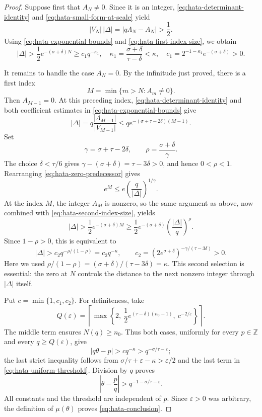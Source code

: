 \documentclass[10pt,a4paper]{amsart}
\begin{document}
\begin{proof}
Suppose first that \(A_N\ne0\).  Since it is an integer,
\eqref{eq:hata-determinant-identity} and
\eqref{eq:hata-small-form-at-scale} yield
\[
 |V_N|\,|\Delta|=|q\Lambda_N-A_N|>\frac12.
\]
Using \eqref{eq:hata-exponential-bounds} and
\eqref{eq:hata-first-index-size}, we obtain
\begin{equation}\label{eq:hata-case-one}
 |\Delta|>\frac12e^{-(\sigma+\delta)N}
 \geq c_1q^{-\kappa_1},
 \quad
 \kappa_1=\frac{\sigma+\delta}{\tau-\delta}<\kappa,
 \quad
 c_1=2^{-1-\kappa_1}e^{-(\sigma+\delta)}>0.
\end{equation}

It remains to handle the case \(A_N=0\).  By the infinitude just proved,
there is a first index
\[
 M=\min\{m>N:A_m\ne0\}.
\]
Then \(A_{M-1}=0\).  At this preceding index,
\eqref{eq:hata-determinant-identity} and both coefficient estimates in
\eqref{eq:hata-exponential-bounds} give
\begin{equation}\label{eq:hata-zero-predecessor}
 |\Delta|=q\frac{|\Lambda_{M-1}|}{|V_{M-1}|}
 \leq q e^{-(\sigma+\tau-2\delta)(M-1)}.
\end{equation}
Set
\[
 \gamma=\sigma+\tau-2\delta,
 \qquad \rho=\frac{\sigma+\delta}{\gamma}.
\]
The choice \(\delta<\tau/6\) gives
\(\gamma-(\sigma+\delta)=\tau-3\delta>0\), and hence
\(0<\rho<1\).  Rearranging \eqref{eq:hata-zero-predecessor} gives
\begin{equation}\label{eq:hata-second-index-size}
 e^M\leq e\left(\frac q{|\Delta|}\right)^{1/\gamma}.
\end{equation}
At the index \(M\), the integer \(A_M\) is nonzero, so the same argument
as above, now combined with \eqref{eq:hata-second-index-size}, yields
\[
 |\Delta|>\frac12e^{-(\sigma+\delta)M}
 \geq\frac12e^{-(\sigma+\delta)}
 \left(\frac{|\Delta|}{q}\right)^\rho.
\]
Since \(1-\rho>0\), this is equivalent to
\begin{equation}\label{eq:hata-case-two}
 |\Delta|>c_2q^{-\rho/(1-\rho)}=c_2q^{-\kappa},
 \qquad
 c_2=\left(2e^{\sigma+\delta}\right)^{-\gamma/(\tau-3\delta)}>0.
\end{equation}
Here we used
\(\rho/(1-\rho)=(\sigma+\delta)/(\tau-3\delta)=\kappa\).
This second selection is essential: the zero at \(N\) controls the
distance to the next nonzero integer through \(|\Delta|\) itself.

Put \(c=\min\{1,c_1,c_2\}\).  For definiteness, take
\begin{equation}\label{eq:hata-uniform-threshold}
 Q(\varepsilon)=\left\lceil\max\left\{
 2,\ \frac12e^{(\tau-\delta)(n_0-1)},\ c^{-2/\varepsilon}
 \right\}\right\rceil.
\end{equation}
The middle term ensures \(N(q)\geq n_0\).  Thus both cases, uniformly
for every \(p\in\mathbb Z\) and every \(q\geq Q(\varepsilon)\), give
\[
 |q\theta-p|>cq^{-\kappa}
 >q^{-\sigma/\tau-\varepsilon};
\]
the last strict inequality follows from
\(\sigma/\tau+\varepsilon-\kappa>\varepsilon/2\) and the last term in
\eqref{eq:hata-uniform-threshold}.  Division by \(q\) proves
\[
 \left|\theta-\frac pq\right|
 >q^{-1-\sigma/\tau-\varepsilon}.
\]
All constants and the threshold are independent of \(p\).  Since
\(\varepsilon>0\) was arbitrary, the definition of \(\mu(\theta)\)
proves \eqref{eq:hata-conclusion}.
\end{proof}
\end{document}

